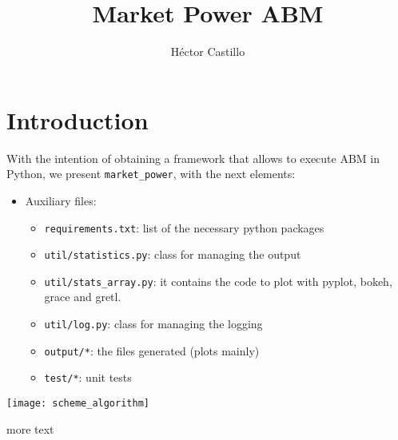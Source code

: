 \documentclass[a4paper,11pt]{article}
\newcommand{\Author}{H\'ector Castillo}
\newcommand{\Title}{Market Power ABM}
\begin{document}
\title{\Title}
\author{\Author}
\maketitle


\section{Introduction}
With the intention of obtaining a framework that allows to execute ABM in Python, we present \texttt{market\_power}, with the next elements:

\begin{itemize}

\item Auxiliary files:
    \begin{itemize}
	  \item  \texttt{requirements.txt}: list of the necessary python packages
	  \item  \texttt{util/statistics.py}: class for managing the output 
	  \item  \texttt{util/stats\_array.py}: it contains the code to plot with pyplot, bokeh, grace and gretl. 
	  \item  \texttt{util/log.py}: class for managing the logging
	  \item  \texttt{output/*}: the files generated (plots mainly)
	  \item  \texttt{test/*}: unit tests
    \end{itemize}
\end{itemize}


\pagebreak


\texttt{[image: scheme\_algorithm]}

%
%

\pagebreak 
more text
\end{document}
